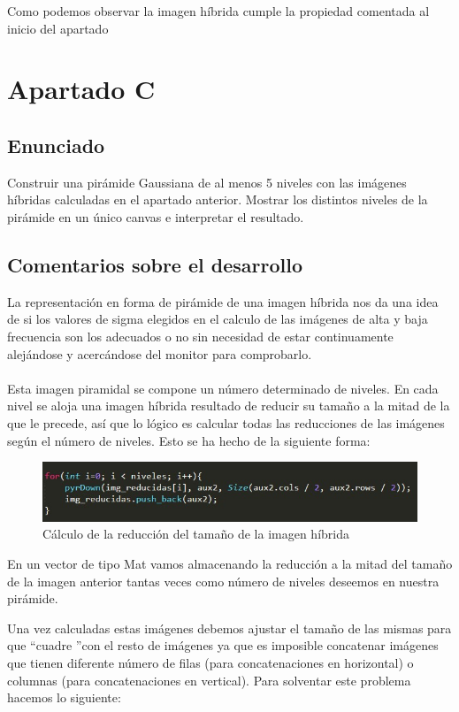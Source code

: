 Como podemos observar la imagen híbrida cumple la propiedad comentada al inicio del apartado

\newpage
\section{Apartado C}

\subsection{Enunciado}

Construir una pirámide Gaussiana  de al menos 5 niveles con las  
imágenes híbridas calculadas en el apartado anterior.  Mostrar los  distintos niveles de la pirámide en un único canvas e interpretar el  resultado. 

\subsection{Comentarios sobre el desarrollo}
La representación en forma de pirámide de una imagen híbrida nos da una idea de si los valores de sigma elegidos en el calculo de las imágenes de alta y baja frecuencia son los adecuados o no sin necesidad de estar continuamente alejándose y acercándose del monitor para comprobarlo.\\
\\
Esta imagen piramidal se compone un número determinado de niveles. En cada nivel se aloja una imagen híbrida resultado de reducir su tamaño a la mitad de la que le precede, así que lo lógico es calcular todas las reducciones de las imágenes según el número de niveles. Esto se ha hecho de la siguiente forma:

\begin{figure}[H]
	\centering
	\includegraphics[width=1\linewidth]{imagenes_reducidas}
	\caption{Cálculo de la reducción del tamaño de la imagen híbrida}
	\label{fig:freq_altasB}
\end{figure}

En un vector de tipo Mat vamos almacenando la reducción a la mitad del tamaño de la imagen anterior tantas veces como número de niveles deseemos en nuestra pirámide.

Una vez calculadas estas imágenes debemos ajustar el tamaño de las mismas para que \textquotedblleft cuadre \textquotedblright con el resto de imágenes ya que es imposible concatenar imágenes que tienen diferente número de filas (para concatenaciones en horizontal) o columnas (para concatenaciones en vertical). Para solventar este problema hacemos lo siguiente:

